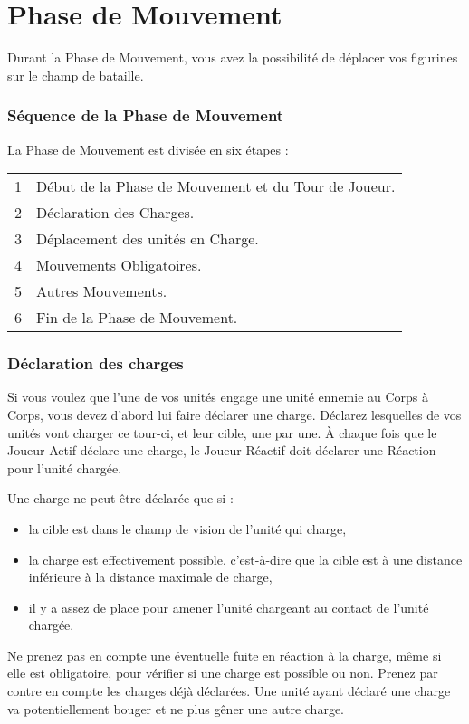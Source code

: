 
\hypertarget{movementphase}{\part{Phase de Mouvement}}

Durant la Phase de Mouvement, vous avez la possibilité de déplacer vos figurines sur le champ de bataille.

\section{Séquence de la Phase de Mouvement}

La Phase de Mouvement est divisée en six étapes :

\hspace*{0.3cm}
\begin{tabular}{c|l}
1 & Début de la Phase de Mouvement et du Tour de Joueur. \tabularnewline
2 & Déclaration des Charges. \tabularnewline
3 & Déplacement des unités en Charge. \tabularnewline
4 & Mouvements Obligatoires. \tabularnewline
5 & Autres Mouvements. \tabularnewline
6 & Fin de la Phase de Mouvement. \tabularnewline
\end{tabular}


\hypertarget{declarecharges}{\section{Déclaration des charges}}

Si vous voulez que l'une de vos unités engage une unité ennemie au Corps à Corps, vous devez d'abord lui faire déclarer une charge. Déclarez lesquelles de vos unités vont charger ce tour-ci, et leur cible, une par une. À chaque fois que le Joueur Actif déclare une charge, le Joueur Réactif doit déclarer une Réaction pour l'unité chargée.

Une charge ne peut être déclarée que si :
\begin{itemize}[label={-}]
\item la cible est dans le champ de vision de l'unité qui charge,
\item la charge est effectivement possible, c'est-à-dire que la cible est à une distance inférieure à la distance maximale de charge,
\item il y a assez de place pour amener l'unité chargeant au contact de l'unité chargée.
\end{itemize}
Ne prenez pas en compte une éventuelle fuite en réaction à la charge, même si elle est obligatoire, pour vérifier si une charge est possible ou non. Prenez par contre en compte les charges déjà déclarées. Une unité ayant déclaré une charge va potentiellement bouger et ne plus gêner une autre charge.

